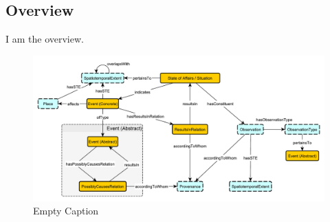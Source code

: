 \subsection{Overview}
\label{ssec:overview}
I am the overview.

\begin{figure}[h!]
  \begin{center}
    \includegraphics[width=\textwidth]{resources/causal-event-pattern.pdf}
  \end{center}
  \caption{Empty Caption}
  \label{fig:ov}
\end{figure}

